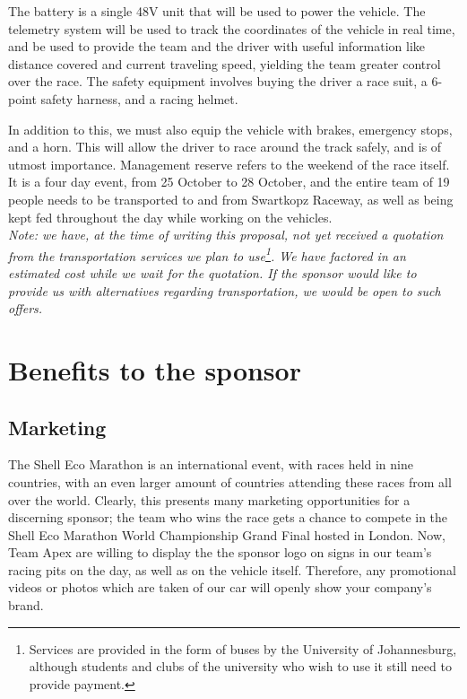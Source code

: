 \documentclass[a4paper, 12pt]{article}
\newcommand{\company}{the sponsor}
\begin{document}
		The battery is a single 48V unit that will be used to power the vehicle. The telemetry system will be used to track the coordinates of the vehicle in real time, and be used to provide the team and the driver with useful information like distance covered and current traveling speed, yielding the team greater control over the race. The safety equipment involves buying the driver a race suit, a 6-point safety harness, and a racing helmet.

		In addition to this, we must also equip the vehicle with brakes, emergency stops, and a horn. This will allow the driver to race around the track safely, and is of utmost importance. Management reserve refers to the weekend of the race itself. It is a four day event, from 25 October to 28 October, and the entire team of 19 people needs to be transported to and from Swartkopz Raceway, as well as being kept fed throughout the day while working on the vehicles.\\

		\noindent\textit{Note: we have, at the time of writing this proposal, not yet received a quotation from the transportation services we plan to use\footnote{Services are provided in the form of buses by the University of Johannesburg, although students and clubs of the university who wish to use it still need to provide payment.}. We have factored in an estimated cost while we wait for the quotation. If \company{} would like to provide us with alternatives regarding transportation, we would be open to such offers.}

	\section{Benefits to \company{}} %
	\label{sec:benefits_to_the_client}
		\subsection{Marketing} %
		\label{sub:marketing}
			The Shell Eco Marathon is an international event, with races held in nine countries, with an even larger amount of countries attending these races from all over the world. Clearly, this presents many marketing opportunities for a discerning sponsor; the team who wins the race gets a chance to compete in the Shell Eco Marathon World Championship Grand Final hosted in London. Now, Team Apex are willing to display the \company{} logo on signs in our team's racing pits on the day, as well as on the vehicle itself. Therefore, any promotional videos or photos which are taken of our car will openly show your company's brand.
		
\end{document}

